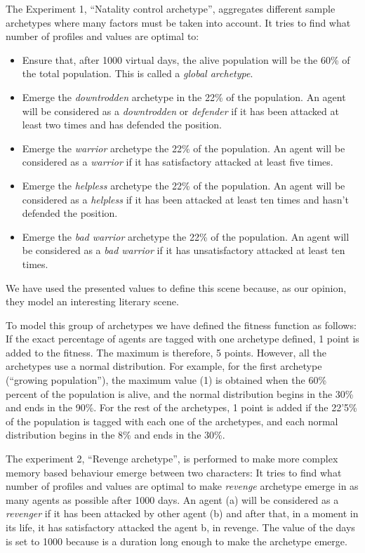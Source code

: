 \documentclass[runningheads]{llncs}
\begin{document}
The Experiment 1, ``Natality control archetype'', aggregates different sample archetypes where many factors must be taken into account.  It tries to find what number of profiles and values are optimal to:
\begin{itemize}
\item Ensure that, after 1000 virtual days, the alive population will be the 60\% of the total population. This is called a \textit{global archetype}.
\item Emerge the \textit{downtrodden} archetype in the 22\% of the
  population. An agent will be considered as a \textit{downtrodden} or
  \textit{defender} if it has been attacked at least two times and has
  defended the position. 
\item Emerge the \textit{warrior} archetype the 22\% of the population. An agent will be considered as a \textit{warrior} if it has satisfactory attacked at least five times. 
\item Emerge the \textit{helpless} archetype the 22\% of the population. An agent will be considered as a \textit{helpless}  if it has been attacked at least ten times and hasn't defended the position.
\item Emerge the \textit{bad warrior} archetype the 22\% of the population. An agent will be considered as a \textit{bad warrior}  if it has unsatisfactory attacked at least ten times.
\end{itemize}
We have used the presented values to define this scene because, as our opinion, they model an interesting literary scene.

To model this group of archetypes we have defined the fitness function as follows:
If the exact percentage of agents are tagged with one archetype defined, 1 point is added to the fitness. The maximum is therefore, 5 points. However, all the archetypes use a normal distribution. For example, for the first archetype (``growing population''), the maximum value (1) is obtained when the 60\% percent of the population is alive, and the normal distribution begins in the 30\% and ends in the 90\%. For the rest of the archetypes, 1 point is added if the 22'5\% of the population is tagged with each one of the archetypes, and each normal distribution begins in the 8\% and ends in the 30\%.


The experiment 2, ``Revenge archetype'', is performed to make more complex memory based behaviour emerge between two characters:  It tries to find what number of profiles and values are optimal to make \textit{revenge} archetype emerge in as many agents as possible after 1000 days.  An agent (a) will be considered as a \textit{revenger} if it has been attacked by other agent (b) and after that, in a moment in its life, it has satisfactory attacked the agent b, in revenge. The value of the days is set to 1000 because is a duration long enough to make the archetype emerge.
\end{document}
